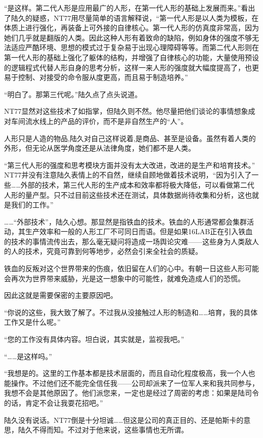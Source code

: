 “是这样。第二代人形是应用最广的人形，在第一代人形的基础上发展而来。”看出了陆久的疑惑，NT77用尽量简单的语言解释说，“第一代人形是以人类为模板，在体质上进行强化，再装备上可外接的自律核心。第一代人形的仿真度非常高，因为她们几乎就是翻版的人类。因此这种人形有着致命的缺陷，例如身体的强度不够无法适应严酷环境、思想的模式过于复杂易于出现心理障碍等等。而第二代人形则在第一代人形的基础上强化了躯体的结构，并增强了自律核心的功能，大量使用预设的逻辑程式代替人形自身的思考分析，这样一来人形的强度就大幅度提高了，也更易于控制、对接受的命令服从度更高，而且易于制造培养。”

“明白了。那第三代呢。”陆久点了点头说道。

NT77显然对这些技术了如指掌，但陆久则不然。他尽量把他们谈论的事情想象成对车间流水线上的产品的评价，而不是非自然生产的“人”。

人形只是人造的物品,陆久对自己这样说着,是商品、甚至是设备。虽然有着人类的外形，但无论从医学角度还是从法律角度，她们都不是人类。

“第三代人形的强度和思考模块方面并没有太大改进，改进的是生产和培育技术。” NT77并没有注意陆久表情上的不自然，继续自顾地做着技术说明，“因为引入了一些……外部的技术，第三代人形的生产成本和效率都将极大降低，可以看做第二代人形的量产型。只不过目前这些技术还在测试，具体数据尚待收集和分析，这也就是我们的工作。”

……“外部技术”，陆久心想。那显然是指铁血的技术。铁血的人形通常都会集群活动，其生产效率和一般的人形工厂不可同日而语。但是如果16LAB正在引入铁血的技术的事情流传出去，那么毫无疑问将造成一场舆论灾难——这些身为人类敌人的人的技术，究竟可靠到何等地步，必然会引来全社会的质疑。

铁血的反叛对这个世界带来的伤痕，依旧留在人们的心中。有朝一日这些人形可能会再次为世界带来威胁，光是这一想象中的可能性，就难免造成人们的恐慌。

因此这就是需要保密的主要原因吧。

“你说的这些，我大致了解了。不过我从没接触过人形的制造和……培育，我的具体工作又是什么呢。”

“您的工作没有具体内容。坦白说，其实就是，监视我吧。”

“……是这样吗。”

“我想是的。这里的工作基本都是技术层面的，而且自动化程度极高，我一个人也能操作。不过他们还不能完全信任我——公司却派来了一位军人来和我共同参与，我想不会是其他原因了。他们派您来，一定也是经过了周密的考虑：如果是陆司令的话，肯定不会让我耍花招吧。”

陆久没有说话。NT77倒是十分坦诚……但这是公司的真正目的、还是帕斯卡的意思，陆久不得而知。不过对于他来说，这些事情也无所谓。

